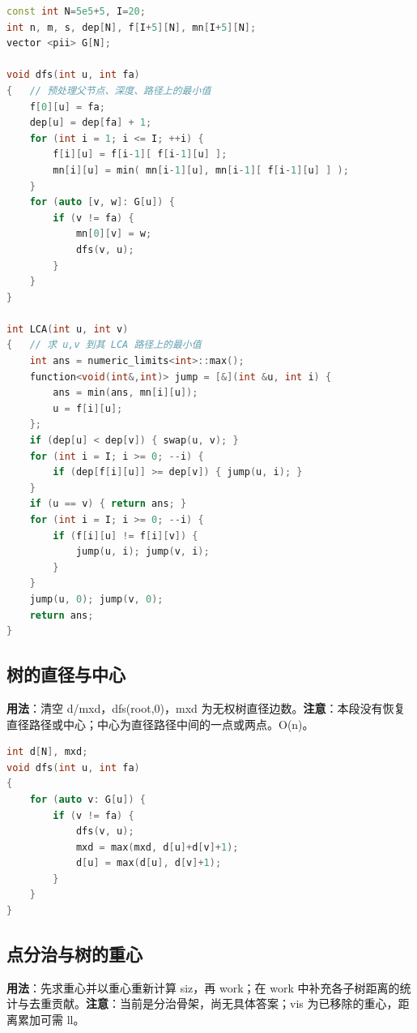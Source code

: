 \documentclass[a4paper,9pt]{extarticle}
\begin{document}
\begin{lstlisting}[language={C++}]
const int N=5e5+5, I=20;
int n, m, s, dep[N], f[I+5][N], mn[I+5][N];
vector <pii> G[N];

void dfs(int u, int fa)
{   // 预处理父节点、深度、路径上的最小值
    f[0][u] = fa;
    dep[u] = dep[fa] + 1;
    for (int i = 1; i <= I; ++i) {
        f[i][u] = f[i-1][ f[i-1][u] ];
        mn[i][u] = min( mn[i-1][u], mn[i-1][ f[i-1][u] ] );
    }
    for (auto [v, w]: G[u]) {
        if (v != fa) {
            mn[0][v] = w;
            dfs(v, u);
        }
    }
}

int LCA(int u, int v)
{   // 求 u,v 到其 LCA 路径上的最小值
    int ans = numeric_limits<int>::max();
    function<void(int&,int)> jump = [&](int &u, int i) {
        ans = min(ans, mn[i][u]);
        u = f[i][u];
    };
    if (dep[u] < dep[v]) { swap(u, v); }
    for (int i = I; i >= 0; --i) {
        if (dep[f[i][u]] >= dep[v]) { jump(u, i); }
    }
    if (u == v) { return ans; }
    for (int i = I; i >= 0; --i) {
        if (f[i][u] != f[i][v]) {
            jump(u, i); jump(v, i);
        }
    }
    jump(u, 0); jump(v, 0);
    return ans;
}
\end{lstlisting}

\subsection{树的直径与中心}

\textbf{用法}：清空 d/\allowbreak{}mxd，dfs(\allowbreak{}root,\allowbreak{}0)，mxd 为无权树直径边数。\textbf{注意}：本段没有恢复直径路径或中心；中心为直径路径中间的一点或两点。O(\allowbreak{}n)。

\begin{lstlisting}[language={C++}]
int d[N], mxd;
void dfs(int u, int fa)
{
	for (auto v: G[u]) {
		if (v != fa) {
			dfs(v, u);
			mxd = max(mxd, d[u]+d[v]+1);
			d[u] = max(d[u], d[v]+1);
		}
	}
}
\end{lstlisting}

\subsection{点分治与树的重心}

\textbf{用法}：先求重心并以重心重新计算 siz，再 work；在 work 中补充各子树距离的统计与去重贡献。\textbf{注意}：当前是分治骨架，尚无具体答案；vis 为已移除的重心，距离累加可需 ll。
\end{document}
